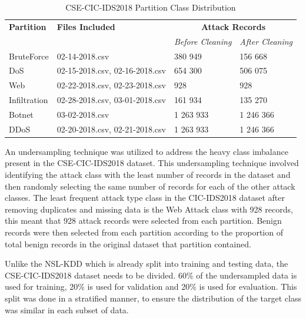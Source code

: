 \documentclass[conference]{IEEEtran}
\begin{document}
\begin{table}[htbp]
\caption{CSE-CIC-IDS2018 Partition Class Distribution}
\begin{center}
\begin{tabular}{|p{1.25cm}|p{2cm}|p{2cm}|p{2cm}|}
\hline
\textbf{Partition} & \textbf{Files Included} &
\multicolumn{2}{|c|}{\textbf{Attack Records}} \\[15pt] %
\cline{3-4}
 & & \textit{Before Cleaning}& \textit{After Cleaning}\\[15pt]
\hline
BruteForce & 02-14-2018.csv & 380 949 & 156 668 \\[5pt] %
\hline 
DoS & 02-15-2018.csv, 02-16-2018.csv &
654 300 & 506 075 \\[5pt] %
\hline
Web & 02-22-2018.csv, 02-23-2018.csv &
928 & 928 \\[5pt] %
\hline
Infiltration & 02-28-2018.csv, 03-01-2018.csv &
161 934 & 135 270 \\[5pt] %
\hline 
Botnet  & 03-02-2018.csv &
1 263 933 & 1 246 366 \\[5pt] %
\hline
DDoS & 02-20-2018.csv, 02-21-2018.csv &
1 263 933 & 1 246 366 \\[5pt] %
\hline
\end{tabular}
\label{tab1}
\end{center}
\end{table}

\noindent An undersampling technique was utilized to address the heavy class imbalance present in the CSE-CIC-IDS2018 dataset. This undersampling technique involved identifying the attack class with the least number of records in the dataset and then randomly selecting the same number of records for each of the other attack classes. The least frequent attack type class in the CIC-IDS2018 dataset after removing duplicates and missing data is the Web Attack class with 928 records, this meant that 928 attack records were selected from each partition. Benign records were then selected from each partition according to the proportion of total benign records in the original dataset that partition contained. 

Unlike the NSL-KDD which is already split into training and testing data, the CSE-CIC-IDS2018 dataset needs to be divided. 60\% of the undersampled data is used for training, 20\% is used for validation and 20\% is used for evaluation. This split was done in a stratified manner, to ensure the distribution of the target class was similar in each subset of data. 
\end{document}
